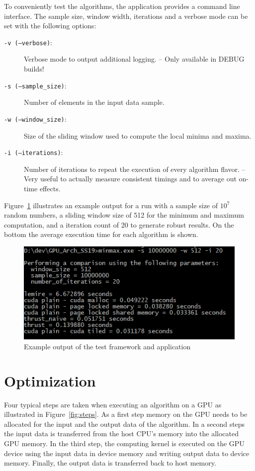 To conveniently test the algorithms, the application provides a command line interface. The sample size, window width, iterations and a verbose mode can be set with the following options:

\begin{description}
    \item[\texttt{-v (--verbose)}:] 
        Verbose mode to output additional logging. -- Only available in DEBUG builds!
    \item[\texttt{-s (--sample\_size)}:] 
        Number of elements in the input data sample.
    \item[\texttt{-w (--window\_size)}:]
        Size of the sliding window used to compute the local minima and maxima.
    \item[\texttt{-i (--iterations)}:] 
        Number of iterations to repeat the execution of every algorithm flavor. -- Very useful to actually measure consistent timings and to average out on-time effects.
\end{description}

Figure~\ref{fig:exampleoutput} illustrates an example output for a run with a sample size of $10^7$ random numbers, a sliding window size of 512 for the minimum and maximum computation, and a iteration count of 20 to generate robust results. On the bottom the average execution time for each algorithm is shown.

\begin{figure}[h]
    \centering
    \includegraphics[width=0.8\linewidth]{Figures/exampleoutput}
    \caption{Example output of the test framework and application}
    \label{fig:exampleoutput}
\end{figure}

\section{Optimization}

Four typical steps are taken when executing an algorithm on a GPU as illustrated in Figure~\ref{fig:steps}. As a first step memory on the GPU needs to be allocated for the input and the output data of the algorithm. In a second steps the input data is transferred from the host CPU's memory into the allocated GPU memory. In the third step, the computing kernel is executed on the GPU device using the input data in device memory and writing output data to device memory. Finally, the output data is transferred back to host memory.

